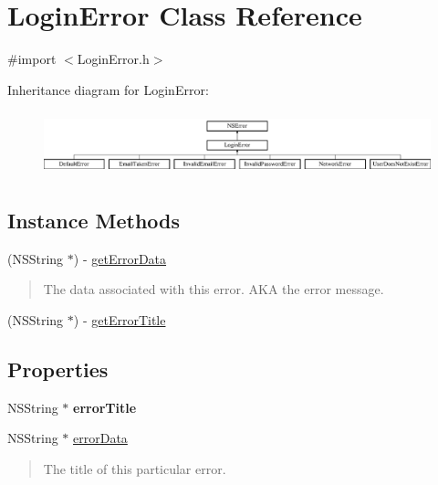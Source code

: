 \hypertarget{interface_login_error}{\section{Login\+Error Class Reference}
\label{interface_login_error}
}


{\ttfamily \#import $<$Login\+Error.\+h$>$}

Inheritance diagram for Login\+Error\+:\begin{figure}[H]
\begin{center}
\leavevmode
\includegraphics[height=1.866667cm]{interface_login_error}
\end{center}
\end{figure}
\subsection*{Instance Methods}
\begin{DoxyCompactItemize}
\item 
(N\+S\+String $\ast$) -\/ \hyperlink{interface_login_error_a74ad6f21ad0e7b6e5a2049cc0549ab0d}{get\+Error\+Data}
\begin{DoxyCompactList}\small\item\em \begin{quote}
The data associated with this error. A\+K\+A the error message. \end{quote}
\end{DoxyCompactList}\item 
(N\+S\+String $\ast$) -\/ \hyperlink{interface_login_error_aab28fd770176eb5a165a8732d895cd0b}{get\+Error\+Title}
\end{DoxyCompactItemize}
\subsection*{Properties}
\begin{DoxyCompactItemize}
\item 
\hypertarget{interface_login_error_a463d3fee91d449b272eaf2bea0442c8d}{N\+S\+String $\ast$ {\bfseries error\+Title}}\label{interface_login_error_a463d3fee91d449b272eaf2bea0442c8d}

\item 
\hypertarget{interface_login_error_af3c0933a371d214254e3623866dbcb6c}{N\+S\+String $\ast$ \hyperlink{interface_login_error_af3c0933a371d214254e3623866dbcb6c}{error\+Data}}\label{interface_login_error_af3c0933a371d214254e3623866dbcb6c}

\begin{DoxyCompactList}\small\item\em \begin{quote}
The title of this particular error. \end{quote}
\end{DoxyCompactList}\end{DoxyCompactItemize}


